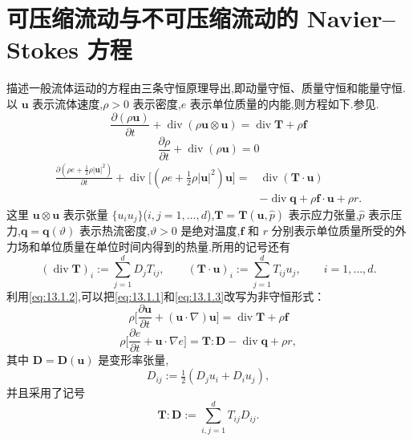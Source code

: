 \section{可压缩流动与不可压缩流动的 Navier--Stokes 方程}\label{sec:13.1}

描述一般流体运动的方程由三条守恒原理导出,即动量守恒、质量守恒和能量守恒.以 \(\boldsymbol{u}\) 表示流体速度,\(\rho>0\) 表示密度,\(e\) 表示单位质量的内能,则方程如下.参见.
\begin{equation}\label{eq:13.1.1}
  \frac{\partial(\rho\boldsymbol{u})}{\partial t}
    +\operatorname{div}(\rho\boldsymbol{u}\otimes\boldsymbol{u})
    =\operatorname{div}\boldsymbol{T}+\rho\boldsymbol{f}
\end{equation}
\begin{equation}\label{eq:13.1.2}
  \frac{\partial\rho}{\partial t}+\operatorname{div}(\rho\boldsymbol{u})=0
\end{equation}
\begin{equation}\label{eq:13.1.3}
  \begin{aligned}
    \frac{\partial(\rho e+\tfrac12\rho|\boldsymbol{u}|^2)}{\partial t}
      +\operatorname{div}\bigl[(\rho e+\tfrac12\rho|\boldsymbol{u}|^2)\boldsymbol{u}\bigr]
     ={}&\operatorname{div}(\boldsymbol{T}\cdot\boldsymbol{u})\\
      &-\operatorname{div}\boldsymbol{q}+\rho\boldsymbol{f}\cdot\boldsymbol{u}+\rho r.
  \end{aligned}
\end{equation}
这里 \(\boldsymbol{u}\otimes\boldsymbol{u}\) 表示张量 \(\{u_i u_j\}\)(\(i,j=1,\ldots,d\)),\(\boldsymbol{T}=\boldsymbol{T}(\boldsymbol{u},\widehat p)\) 表示应力张量,\(\widehat p\) 表示压力,\(\boldsymbol{q}=\boldsymbol{q}(\vartheta)\) 表示热流密度,\(\vartheta>0\) 是绝对温度,\(\boldsymbol{f}\) 和 \(r\) 分别表示单位质量所受的外力场和单位质量在单位时间内得到的热量.所用的记号还有
\[
  (\operatorname{div}\boldsymbol{T})_i:=\sum_{j=1}^dD_jT_{ij},\qquad
  (\boldsymbol{T}\cdot\boldsymbol{u})_i:=\sum_{j=1}^dT_{ij}u_j,\qquad i=1,\ldots,d.
\]
利用\eqref{eq:13.1.2},可以把\eqref{eq:13.1.1}和\eqref{eq:13.1.3}改写为非守恒形式：
\begin{equation}\label{eq:13.1.4}
  \rho\biggl[\frac{\partial\boldsymbol{u}}{\partial t}
      +(\boldsymbol{u}\cdot\nabla)\boldsymbol{u}\biggr]
    =\operatorname{div}\boldsymbol{T}+\rho\boldsymbol{f}
\end{equation}
\begin{equation}\label{eq:13.1.5}
  \rho\biggl[\frac{\partial e}{\partial t}+\boldsymbol{u}\cdot\nabla e\biggr]
    =\boldsymbol{T}:\boldsymbol{D}-\operatorname{div}\boldsymbol{q}+\rho r,
\end{equation}
其中 \(\boldsymbol{D}=\boldsymbol{D}(\boldsymbol{u})\) 是变形率张量,
\[
  D_{ij}:=\tfrac12(D_ju_i+D_iu_j),
\]
并且采用了记号
\[
  \boldsymbol{T}:\boldsymbol{D}:=\sum_{i,j=1}^d T_{ij}D_{ij}.
\]

